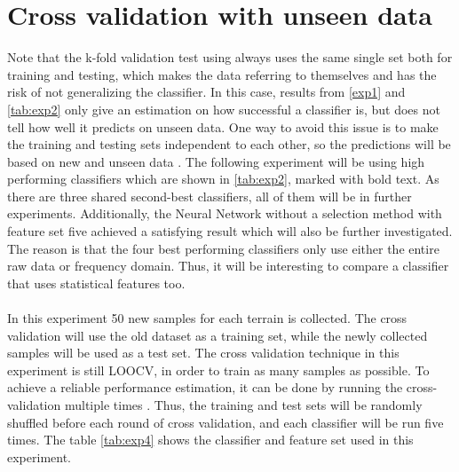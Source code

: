 \documentclass[USenglish]{ifimaster}  %
\begin{document}
\section{Cross validation with unseen data} \label{seq:crossunseen}
Note that the k-fold validation test using always uses the same single set both for training and testing, which makes the data referring to themselves and has the risk of not generalizing the classifier. In this case, results from \ref{exp1} and \ref{tab:exp2} only give an estimation on how successful a classifier is, but does not tell how well it predicts on unseen data. One way to avoid this issue is to make the training and testing sets independent to each other, so the predictions will be based on new and unseen data \cite{26b23e912c654fe4b7478fd910130195}. The following experiment will be using high performing classifiers which are shown in \ref{tab:exp2}, marked with bold text. As there are three shared second-best classifiers, all of them will be in further experiments. Additionally, the Neural Network without a selection method with feature set five achieved a satisfying result which will also be further investigated. The reason is that the four best performing classifiers only use either the entire raw data or frequency domain. Thus, it will be interesting to compare a classifier that uses statistical features too.
\\
\\
In this experiment 50 new samples for each terrain is collected. The cross validation will use the old dataset as a training set, while the newly collected samples will be used as a test set. The cross validation technique in this experiment is still LOOCV, in order to train as many samples as possible. To achieve a reliable performance estimation, it can be done by running the cross-validation multiple times \cite{Refaeilzadeh2009}. Thus, the training and test sets will be randomly shuffled before each round of cross validation, and each classifier will be run five times. The table \ref{tab:exp4} shows the classifier and feature set used in this experiment.
\end{document}

